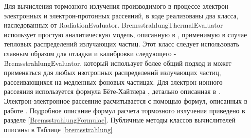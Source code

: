 Для вычисления тормозного излучения производимого в процессе электрон-электронных и электрон-протонных рассеяний, в коде реализованы два класса, наследованных от RadiationEvaluator. BremsstrahlungThermalEvaluator использует простую аналитическую модель, описанную в \cite{Rybicki}, применимую в случае тепловых распределений излучающих частиц. Этот класс следует использовать главным образом для отладки и калибровки следующего - BremsstrahlungEvaluator, который использует более общий подход и может применяться для любых изотропных распределений излучающих частиц, рассеивающихся на медленных фоновых частицах. Для электрон-ионного рассеяния используется формула Бёте-Хайтлера \cite{BetheHeitler}, детально описанная в \cite{JauchRohrlich}. Электрон-электронное рассеяние расчитывается с помощью формул, описанных в работе \cite{Baring1999}. Подробное описание формул расчета тормозного излучения приведено в разделе \ref{BremsstrahlungFormulae}. Публичные методы классов вычислителей описаны в Таблице \ref{bremsstrahlung}

